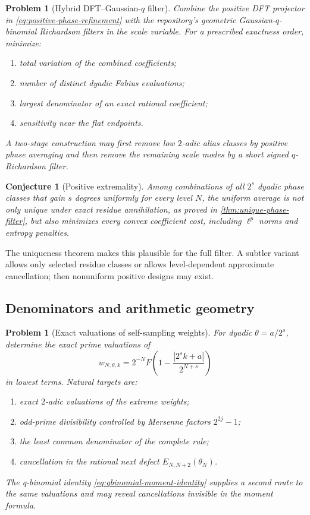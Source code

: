 \documentclass[11pt]{article}
\numberwithin{equation}{section}
\newtheorem{conjecture}[theorem]{Conjecture}
\newtheorem{problem}[theorem]{Problem}
\theoremstyle{definition}
\theoremstyle{remark}
\newcommand{\abs}[1]{\left|#1\right|}
\begin{document}
\begin{problem}[Hybrid DFT--Gaussian-$q$ filter]
\label{prob:hybrid-filter}
Combine the positive DFT projector in \eqref{eq:positive-phase-refinement} with the repository's geometric Gaussian-$q$-binomial Richardson filters in the scale variable.  For a prescribed exactness order, minimize:
\begin{enumerate}
\item total variation of the combined coefficients;
\item number of distinct dyadic Fabius evaluations;
\item largest denominator of an exact rational coefficient;
\item sensitivity near the flat endpoints.
\end{enumerate}
A two-stage construction may first remove low $2$-adic alias classes by positive phase averaging and then remove the remaining scale modes by a short signed $q$-Richardson filter.
\end{problem}

\begin{conjecture}[Positive extremality]
\label{conj:positive-extremality}
Among combinations of all $2^s$ dyadic phase classes that gain $s$ degrees uniformly for every level $N$, the uniform average is not only unique under exact residue annihilation, as proved in \cref{thm:unique-phase-filter}, but also minimizes every convex coefficient cost, including $\ell^p$ norms and entropy penalties.
\end{conjecture}

The uniqueness theorem makes this plausible for the full filter.  A subtler variant allows only selected residue classes or allows level-dependent approximate cancellation; then nonuniform positive designs may exist.

\subsection{Denominators and arithmetic geometry}

\begin{problem}[Exact valuations of self-sampling weights]
\label{prob:weight-valuations}
For dyadic $\theta=a/2^s$, determine the exact prime valuations of
\[
 w_{N,\theta,k}=2^{-N}F\!\left(1-\frac{\abs{2^sk+a}}{2^{N+s}}\right)
\]
in lowest terms.  Natural targets are:
\begin{enumerate}
\item exact $2$-adic valuations of the extreme weights;
\item odd-prime divisibility controlled by Mersenne factors $2^{2j}-1$;
\item the least common denominator of the complete rule;
\item cancellation in the rational next defect $E_{N,N+2}(\theta_N)$.
\end{enumerate}
The q-binomial identity \eqref{eq:qbinomial-moment-identity} supplies a second route to the same valuations and may reveal cancellations invisible in the moment formula.
\end{problem}
\end{document}
